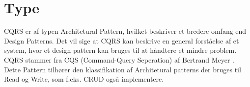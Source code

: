 \section{Type}

CQRS er af typen Architetural Pattern, hvilket beskriver et bredere omfang end Design Patterns. Det vil sige at CQRS kan beskrive en general forståelse af et system, hvor et design pattern kan bruges til at håndtere et mindre problem. CQRS stammer fra CQS (Command-Query Seperation) af Bertrand Meyer \cite{wikipedia-CQS}. 
Dette Pattern tilhører den klassifikation af Architetural patterns der bruges til Read og Write, som f.eks. CRUD også implementere.

